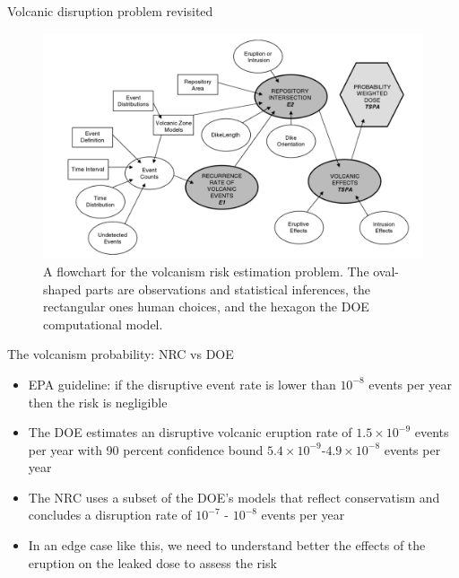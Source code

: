 \documentclass[10pt]{beamer}
\begin{document}
    \begin{frame}{Volcanic disruption problem revisited}
        \begin{figure}
		\includegraphics[height=0.6\textheight]{volcano}
        \caption*{A flowchart for the volcanism risk estimation problem. The oval-shaped parts are observations and statistical inferences, the rectangular ones human choices, and the hexagon the DOE computational model. \cite{me06}}
		\end{figure}
    \end{frame}
    
    \begin{frame}{The volcanism probability: NRC vs DOE}
    \begin{itemize}[<+->]
    	\item EPA guideline: if the disruptive event rate is lower than \alert{$10^{-8}$} events per year then the risk is negligible
    	\item The DOE estimates an disruptive volcanic eruption rate of $1.5\times 10^{-9}$ events per year
        with 90 percent confidence bound \alert{$5.4\times 10^{-9}$-$4.9\times 10^{-8}$} events per year
        
        \item The NRC uses a subset of the DOE's models that reflect conservatism and concludes a disruption rate of \alert{$10^{-7}$ - $10^{-8}$} events per year
        
        \item In an edge case like this, we need to understand better the effects of the eruption on the leaked dose to assess the risk
    \end{itemize}
    \end{frame}
\end{document}
